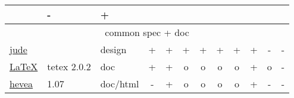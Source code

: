 \begin{tabular}[t]{|lll|cc|ccccccc|}
    &
    - %
    &
    + %
    \\\hline
    \multicolumn{12}{|c|}{common spec + doc}
    \\\hline
    \href{https://www.esm.jp/jude-web/en/index.html}{jude}
    &
    & 
    design %
    & 
    +  %
    & 
    +  %
    &
    + %
    &
    + %
    &
    + %
    &
    + %
    & 
    + %
    &
    - %
    &
    - %
    \\
    \href{http://www.latex-project.org/}{\LaTeX}
    &
    tetex 2.0.2 %
    & 
    doc %
    & 
    +  %
    & 
    + %
    &
    o %
    &
    o %
    &
    o %
    &
    o %
    & 
    + %
    &
    o %
    &
    - %
    \\
    \href{http://pauillac.inria.fr/~maranget/hevea}{hevea}
    &
    1.07 %
    & 
    doc/html 
    & 
    - %
    & 
    + %
    &
    o %
    &
    o %
    &
    o %
    &
    o %
    & 
    + %
    &
    - %
    &
    - %
    \\\hline
  \end{tabular}


